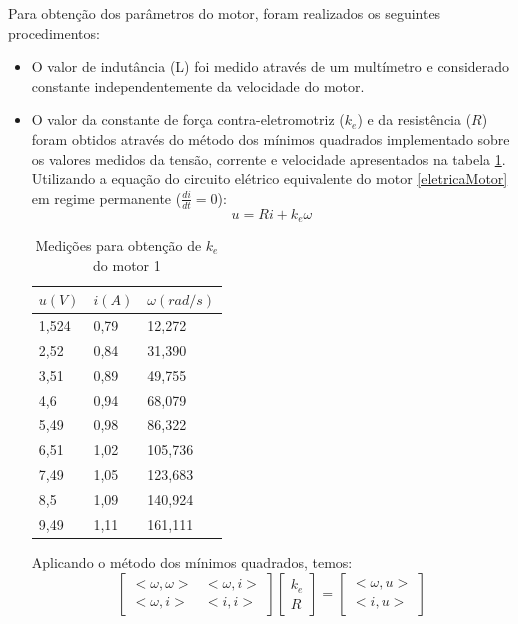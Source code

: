 \documentclass[]{politex}
\begin{document}
Para obtenção dos parâmetros do motor, foram realizados os seguintes procedimentos: 
\begin{itemize}
\item O valor de indutância (L) foi medido através de um multímetro e considerado constante independentemente da velocidade do motor.

\item O valor da constante de força contra-eletromotriz ($k_{e}$) e da resistência ($R$) foram obtidos através do método dos mínimos quadrados implementado sobre os valores medidos da tensão, corrente e velocidade apresentados na tabela \ref{MMQke}. Utilizando a equação do circuito elétrico equivalente do motor \eqref{eletricaMotor} em regime permanente ($\frac{di}{dt} = 0$): 
\begin{equation}
	   u =  R i + k_{e} \omega
\end{equation}

\begin{table}[H]
\centering
\caption{Medições para obtenção de $k_{e}$ do motor 1}
\label{MMQke}
\begin{tabular}{l|l|l}
$u(V)$     & $i(A)$    & $\omega (rad/s)$        \\ \hline
1{,}524 & 0{,}79 & 12{,}272  \\
2{,}52  & 0{,}84 & 31{,}390  \\
3{,}51  & 0{,}89 & 49{,}755  \\
4{,}6   & 0{,}94 & 68{,}079  \\
5{,}49  & 0{,}98 & 86{,}322  \\
6{,}51  & 1{,}02 & 105{,}736 \\
7{,}49  & 1{,}05 & 123{,}683 \\
8{,}5   & 1{,}09 & 140{,}924 \\
9{,}49  & 1{,}11 & 161{,}111
\end{tabular}
\end{table}

Aplicando o método dos mínimos quadrados, temos:
\begin{equation}
\begin{bmatrix}
<\omega, \omega> & <\omega, i>\\
<\omega, i>      & <i, i>
\end{bmatrix}
\begin{bmatrix}
k_{e}\\
R
\end{bmatrix}= 
\begin{bmatrix}
<\omega, u>\\
<i, u>
\end{bmatrix}
\end{equation}


\end{itemize}
\end{document}
